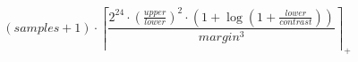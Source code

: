 \[\left(samples + 1\right) \cdot \left\lceil \frac{2^{24} \cdot \left(\frac{upper}{lower}\right)^{2} \cdot \left(1 + \log\left(1 + \frac{lower}{contrast}\right)\right)}{margin^{3}} \right\rceil_{+}\]
